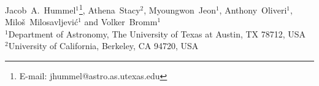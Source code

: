 
Jacob~A.~Hummel$^1$\thanks{E-mail: jhummel@astro.as.utexas.edu},
  Athena~Stacy$^2$, Myoungwon~Jeon$^1$, Anthony~Oliveri$^1$, 
\newauthor Milo\v s~Milosavljevi\'c$^1$ and Volker~Bromm$^1$\\
$^1$Department of Astronomy, The University of Texas at Austin, TX 78712, USA\\
$^2$University of California, Berkeley, CA 94720, USA
 
